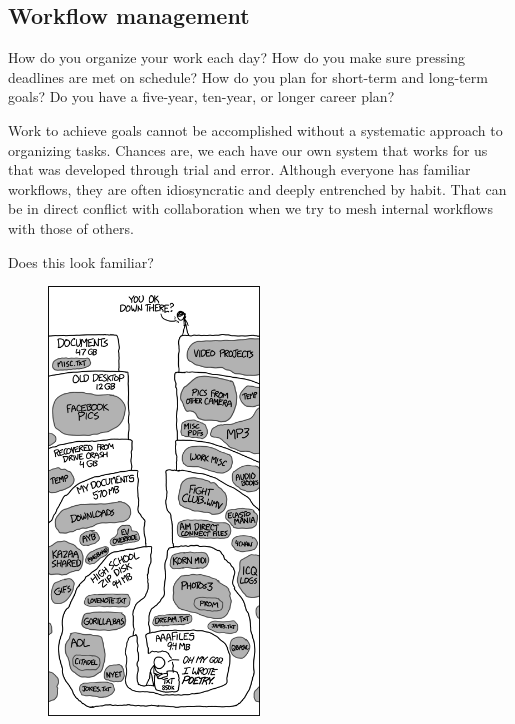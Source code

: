 \documentclass[
  letterpaper,
  DIV=11,
  numbers=noendperiod]{scrreprt}
\begin{document}
\hypertarget{workflow-management}{%
\subsection{Workflow management}\label{workflow-management}}

How do you organize your work each day? How do you make sure pressing
deadlines are met on schedule? How do you plan for short-term and
long-term goals? Do you have a five-year, ten-year, or longer career
plan?

Work to achieve goals cannot be accomplished without a systematic
approach to organizing tasks. Chances are, we each have our own system
that works for us that was developed through trial and error. Although
everyone has familiar workflows, they are often idiosyncratic and deeply
entrenched by habit. That can be in direct conflict with collaboration
when we try to mesh internal workflows with those of others.

Does this look familiar?

\begin{figure}

{\centering \includegraphics[width=0.5\textwidth,height=\textheight]{./img/old_files.png}

}

\end{figure}
\end{document}
